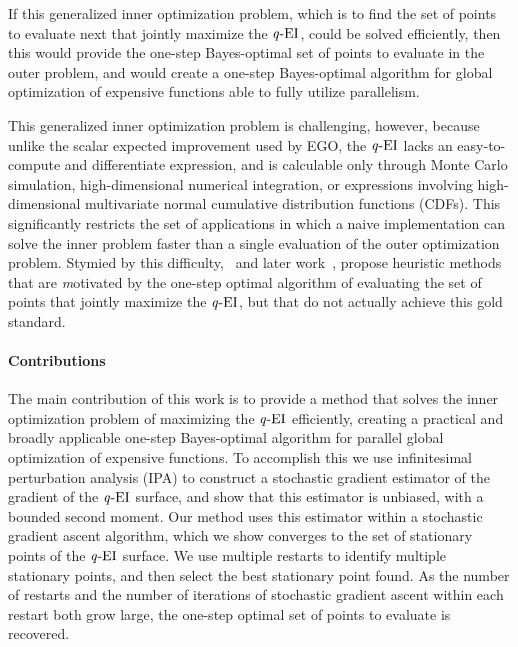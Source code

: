 \documentclass[paper=letter]{scrartcl}
\newcommand{\qEI}{\text{\textit q-EI}}
\begin{document}
If this generalized inner optimization problem, 
which is to find the set of points to evaluate next that jointly maximize the $\qEI$,
could be solved efficiently, then this would provide the one-step Bayes-optimal set 
of points to evaluate in the outer problem, 
and would create a one-step Bayes-optimal algorithm for global optimization of expensive functions 
able to fully utilize parallelism.

This generalized inner optimization problem is challenging, however, because unlike the scalar expected improvement used by EGO,
the $\qEI$ lacks an easy-to-compute and differentiate expression, and is calculable only through Monte Carlo simulation, 
high-dimensional numerical integration, or expressions involving high-dimensional multivariate normal cumulative distribution functions (CDFs).
This significantly restricts the set of applications in which a naive implementation can solve the inner problem faster than a single evaluation of the outer optimization problem.
Stymied by this difficulty,~\cite{GiLeCa08} and later work~\citep{chevalier2013fast}, 
propose heuristic methods that are {\textit motivated} by the one-step optimal algorithm 
of evaluating the set of points that jointly maximize the $\qEI$, but that do not 
actually achieve this gold standard.

\paragraph{Contributions}

The main contribution of this work is to provide a method that solves the inner optimization 
problem of maximizing the $\qEI$ efficiently, creating a practical and broadly applicable one-step Bayes-optimal algorithm for parallel 
global optimization  of expensive functions. To accomplish this we use infinitesimal
perturbation analysis (IPA) \citep{Ho1987} to construct a stochastic gradient
estimator of the gradient of the $\qEI$ surface, and show that this estimator is
unbiased, with a bounded second moment.  Our method uses this estimator within a stochastic gradient ascent
algorithm, which we show converges to the set of stationary points of the $\qEI$ surface.
We use multiple restarts to identify multiple stationary
points, and then select the best stationary
point found.  As the number of restarts and the number of iterations of
stochastic gradient ascent within each restart both grow large, the one-step
optimal set of points to evaluate is recovered. 
\end{document}
